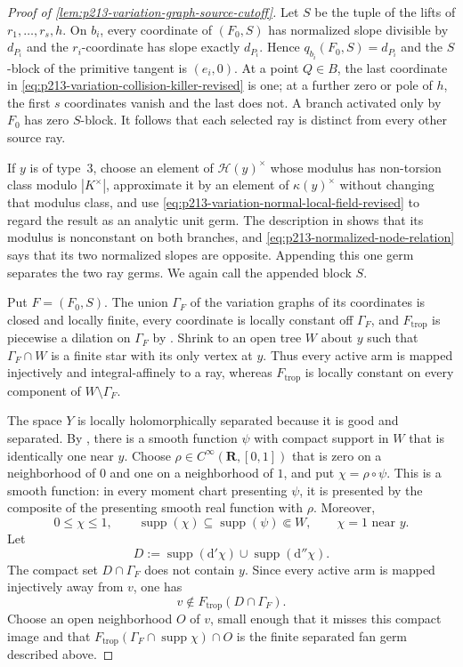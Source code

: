 \begin{proof}[Proof of
\cref{lem:p213-variation-graph-source-cutoff}]
Let $S$ be the tuple of the lifts of $r_1,\ldots,r_s,h$.  On $b_i$, every
coordinate of $(F_0,S)$ has normalized slope divisible by $d_{P_i}$ and
the $r_i$-coordinate has slope exactly $d_{P_i}$.  Hence
$q_{b_i}(F_0,S)=d_{P_i}$ and the $S$-block of the primitive tangent is
$(e_i,0)$.  At a point $Q\in B$, the last coordinate in
\eqref{eq:p213-variation-collision-killer-revised} is one; at a further
zero or pole of $h$, the first $s$ coordinates vanish and the last does
not.  A branch activated only by $F_0$ has zero $S$-block.  It follows
that each selected ray is distinct from every other source ray.

If $y$ is of type~$3$, choose an element of $\mathcal H(y)^\times$ whose
modulus has non-torsion class modulo $|K^\times|$, approximate it by an
element of $\kappa(y)^\times$ without changing that modulus class, and use
\eqref{eq:p213-variation-normal-local-field-revised} to regard the result
as an analytic unit germ.  The description in
\cite[\S4.2.11.2]{Ducros24CurveStructure} shows that its modulus is
nonconstant on both branches, and
\eqref{eq:p213-normalized-node-relation} says that its two normalized
slopes are opposite.  Appending this one germ separates the two ray
germs.  We again call the appended block $S$.

Put $F=(F_0,S)$.  The union $\Gamma_F$ of the variation graphs of its
coordinates is closed and locally finite, every coordinate is locally
constant off $\Gamma_F$, and $F_{\mathrm{trop}}$ is piecewise a dilation
on $\Gamma_F$ by \cite[\S\S4.5.21.1--4.5.21.2]
{Ducros24CurveStructure}.  Shrink to an open tree $W$ about $y$ such that
$\Gamma_F\cap W$ is a finite star with its only vertex at $y$.  Thus every
active arm is mapped injectively and integral-affinely to a ray, whereas
$F_{\mathrm{trop}}$ is locally constant on every component of
$W\setminus\Gamma_F$.

The space $Y$ is locally holomorphically separated because it is good and
separated.  By \cite[Corollary~15.2.5]{CLD25}, there is a smooth function
$\psi$ with compact support in $W$ that is identically one near $y$.
Choose $\rho\in C^\infty(\mathbf R,[0,1])$ that is zero on a neighborhood
of $0$ and one on a neighborhood of $1$, and put $\chi=\rho\circ\psi$.
This is a smooth function: in every moment chart presenting $\psi$, it is
presented by the composite of the presenting smooth real function with
$\rho$.  Moreover,
\[
 0\leq\chi\leq1,\qquad
 \operatorname{supp}(\chi)\subseteq\operatorname{supp}(\psi)\Subset W,
 \qquad \chi=1\text{ near }y.
\]
Let
\[
        D:=\operatorname{supp}(\mathrm d'\chi)
             \cup\operatorname{supp}(\mathrm d''\chi).
\]
The compact set $D\cap\Gamma_F$ does not contain $y$.  Since every active
arm is mapped injectively away from $v$, one has
\[
                v\notin F_{\mathrm{trop}}(D\cap\Gamma_F).
\]
Choose an open neighborhood $O$ of $v$, small enough that it misses this
compact image and that
$F_{\mathrm{trop}}(\Gamma_F\cap\operatorname{supp}\chi)\cap O$ is the
finite separated fan germ described above.


\end{proof}

